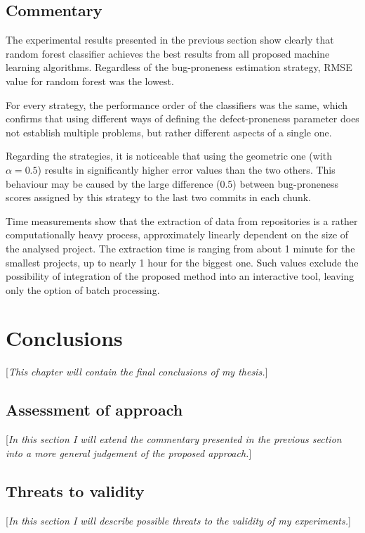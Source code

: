 \documentclass{pracamgr}
\begin{document}
\section{Commentary}
\label{sec:commentary}
The experimental results presented in the previous section show clearly that random forest classifier achieves the best results from all proposed machine learning algorithms. Regardless of the bug-proneness estimation strategy, RMSE value for random forest was the lowest.

For every strategy, the performance order of the classifiers was the same, which confirms that using different ways of defining the defect-proneness parameter does not establish multiple problems, but rather different aspects of a single one.

Regarding the strategies, it is noticeable that using the geometric one (with $\alpha = 0.5$) results in significantly higher error values than the two others. This behaviour may be caused by the large difference (0.5) between bug-proneness scores assigned by this strategy to the last two commits in each chunk.

Time measurements show that the extraction of data from repositories is a rather computationally heavy process, approximately linearly dependent on the size of the analysed project. The extraction time is ranging from about 1 minute for the smallest projects, up to nearly 1 hour for the biggest one. Such values exclude the possibility of integration of the proposed method into an interactive tool, leaving only the option of batch processing.

\chapter{Conclusions}
\label{cha:conclusions}
[\textit{This chapter will contain the final conclusions of my thesis.}]

\section{Assessment of approach}
\label{sec:assessment}
[\textit{In this section I will extend the commentary presented in the previous section into a more general judgement of the proposed approach.}]

\section{Threats to validity}
\label{sec:threats}
[\textit{In this section I will describe possible threats to the validity of my experiments.}]
\end{document}
